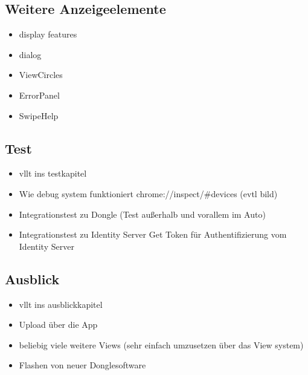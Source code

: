 \subsection{Weitere Anzeigeelemente}
\label{sec:appAnzeigeelemente}

\begin{itemize}
\item display features
\item dialog
\item ViewCircles
\item ErrorPanel
\item SwipeHelp
\end{itemize}

\subsection{Test}
\label{sec:appTest}

\begin{itemize}
\item vllt ins testkapitel
\item Wie debug system funktioniert chrome://inspect/\#devices (evtl bild)
\item Integrationstest zu Dongle (Test außerhalb und vorallem im Auto)
\item Integrationstest zu Identity Server Get Token für Authentifizierung vom Identity Server
\end{itemize}

\subsection{Ausblick}
\label{sec:appAusblick}

\begin{itemize}
\item vllt ins ausblickkapitel
\item Upload über die App
\item beliebig viele weitere Views (sehr einfach umzusetzen über das View system)
\item Flashen von neuer Donglesoftware
\end{itemize}
  

 
 
 
 
 
 
 
 